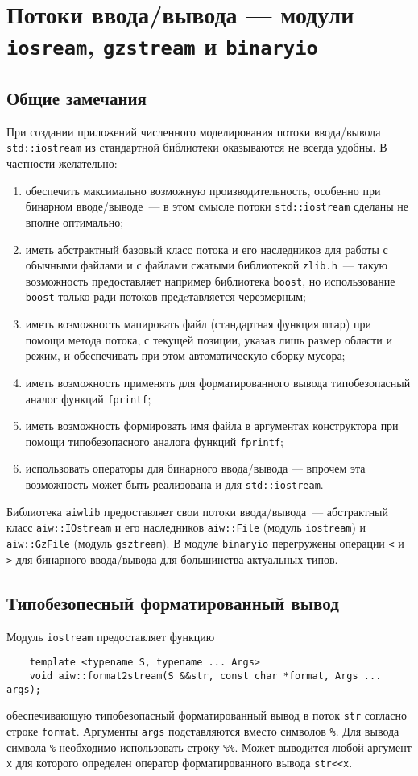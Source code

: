 \section{Потоки ввода/вывода --- модули {\tt iosream}, {\tt gzstream} и {\tt binaryio}}
\subsection{Общие замечания}
При создании приложений численного моделирования потоки ввода/вывода \verb'std::iostream'
из стандартной библиотеки оказываются не всегда удобны. В частности желательно:
\begin{enumerate}
\item обеспечить максимально возможную производительность, особенно при бинарном вводе/выводе~---
  в этом смысле потоки \verb'std::iostream' сделаны не вполне оптимально;
\item иметь абстрактный базовый класс потока и его наследников для работы с обычными файлами и с файлами сжатыми
  библиотекой \verb'zlib.h'~--- такую возможность предоставляет например библиотека
  \verb'boost', но использование \verb'boost' только ради потоков предcтавляется черезмерным;
\item иметь возможность мапировать файл (стандартная функция \verb'mmap') при помощи метода потока,
  с текущей позиции, указав лишь размер области и режим, и обеспечивать при этом автоматическую сборку мусора;
\item иметь возможность применять для форматированного вывода типобезопасный аналог функций \verb'fprintf';
\item иметь возможность формировать имя файла в аргументах конструктора при помощи типобезопасного аналога функций \verb'fprintf';
\item использовать операторы для бинарного ввода/вывода --- впрочем эта возможность может быть реализована и для
  \verb'std::iostream'.
\end{enumerate}
Библиотека \verb'aiwlib' предоставляет свои потоки ввода/вывода~--- абстрактный класс \verb'aiw::IOstream'
и его наследников \verb'aiw::File' (модуль \verb'iostream') и \verb'aiw::GzFile' (модуль \verb'gsztream'). В модуле \verb'binaryio'
перегружены операции \verb'<' и \verb'>' для бинарного ввода/вывода для большинства актуальных типов.

\subsection{Типобезопесный форматированный вывод}
Модуль \verb'iostream' предоставляет функцию
\begin{verbatim}
    template <typename S, typename ... Args>
    void aiw::format2stream(S &&str, const char *format, Args ... args);
\end{verbatim}
обеспечивающую типобезопасный форматированный вывод в поток \verb'str' согласно строке \verb'format'.
Аргументы \verb'args' подставляются вместо символов \verb'%'.
Для вывода символа \verb'%' необходимо использовать строку \verb'%%'.
Может выводится любой аргумент \verb'x' для которого определен оператор
форматированного вывода \verb'str<<x'.

